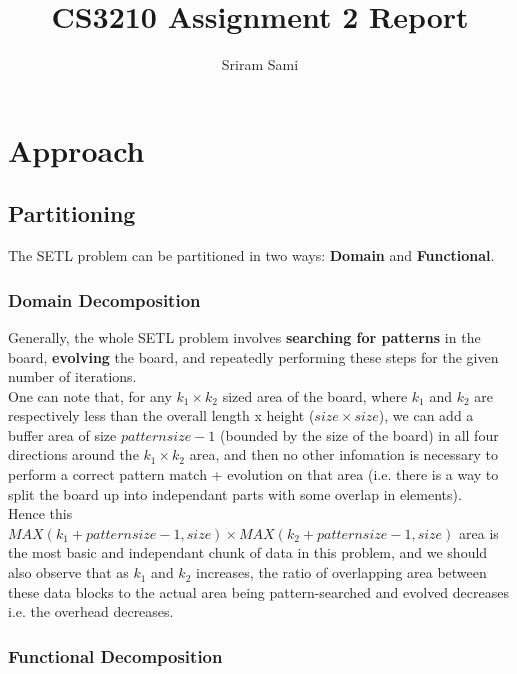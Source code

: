 \documentclass[12pt,a4paper]{article}
\author{Sriram Sami}
\title{CS3210 Assignment 2 Report}
\begin{document}
\maketitle
\tableofcontents

\newpage

\section{Approach}

\subsection{Partitioning}

The SETL problem can be partitioned in two ways: \textbf{Domain} and \textbf{Functional}. 

\subsubsection{Domain Decomposition}

Generally, the whole SETL problem involves \textbf{searching for patterns} in the board, \textbf{evolving} the board, and repeatedly performing these steps for the given number of iterations.\\

One can note that, for any $k_1 \times k_2$ sized area of the board, where $k_1$ and $k_2$ are respectively less than the overall length x height ($size \times size$), we can add a buffer area of size $patternsize - 1$ (bounded by the size of the board) in all four directions around the $k_1 \times k_2$ area, and then no other infomation is necessary to perform a correct pattern match + evolution on that area (i.e. there is a way to split the board up into independant parts with some overlap in elements). \\

Hence this $MAX(k_1 + patternsize - 1, size) \times MAX(k_2 + patternsize - 1, size)$ area is the most basic and independant chunk of data in this problem, and we should also observe that as $k_1$ and $k_2$ increases, the ratio of overlapping area between these data blocks to the actual area being pattern-searched and evolved decreases i.e. the overhead decreases. 

\subsubsection{Functional Decomposition}
\end{document}
